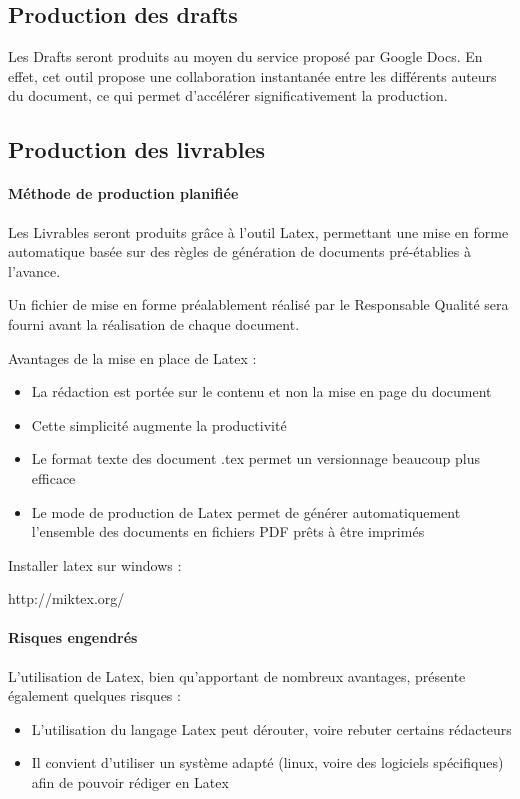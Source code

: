 \documentclass{mise_en_page}
\begin{document}
\subsection{Production des drafts}
Les Drafts seront produits au moyen du service proposé par Google Docs.
En effet, cet outil propose une collaboration instantanée entre les
différents auteurs du document, ce qui permet d’accélérer
significativement la production.

\subsection{Production des livrables}
\paragraph{Méthode de production planifiée}
Les Livrables seront produits grâce à l’outil Latex, permettant une mise
en forme automatique basée sur des règles de génération de documents
pré-établies à l’avance.




Un fichier de mise en forme préalablement réalisé par le Responsable
Qualité sera fourni avant la réalisation de chaque document.




Avantages de la mise en place de Latex :

\begin{itemize}
\item La rédaction est portée sur le contenu et non la mise en page du
document
\item Cette simplicité augmente la productivité
\item Le format texte des document .tex permet un versionnage beaucoup
plus efficace
\item Le mode de production de Latex permet de générer automatiquement
l’ensemble des documents en fichiers PDF prêts à être imprimés
\end{itemize}



Installer latex sur windows :

http://miktex.org/

\paragraph{Risques engendrés}
L’utilisation de Latex, bien qu’apportant de nombreux avantages,
présente également quelques risques :

\begin{itemize}
\item L’utilisation du langage Latex peut dérouter, voire rebuter
certains rédacteurs
\item Il convient d’utiliser un système adapté (linux, voire des
logiciels spécifiques) afin de pouvoir rédiger en Latex
\end{itemize}
\end{document}
